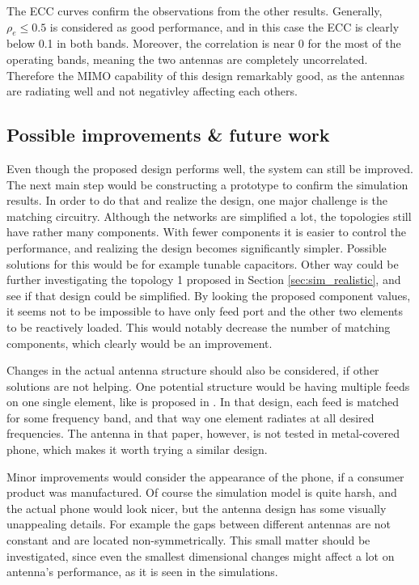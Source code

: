 The ECC curves confirm the observations from the other results. Generally, $\rho_e\leq0.5$ is considered as good performance, and in this case the ECC is clearly below 0.1 in both bands. Moreover, the correlation is near 0 for the most of the operating bands, meaning the two antennas are completely uncorrelated. Therefore the MIMO capability of this design remarkably good, as the antennas are radiating well and not negativley affecting each others.

\subsection{Possible improvements \& future work}
\label{sec:improvements}
Even though the proposed design performs well, the system can still be improved. The next main step would be constructing a prototype to confirm the simulation results. In order to do that and realize the design, one major challenge is the matching circuitry. Although the networks are simplified a lot, the topologies still have rather many components. With fewer components it is easier to control the performance, and realizing the design becomes significantly simpler. Possible solutions for this would be for example tunable capacitors. Other way could be further investigating the topology 1 proposed in Section \ref{sec:sim_realistic}, and see if that design could be simplified. By looking the proposed component values, it seems not to be impossible to have only feed port and the other two elements to be reactively loaded. This would notably decrease the number of matching components, which clearly would be an improvement.

Changes in the actual antenna structure should also be considered, if other solutions are not helping. One potential structure would be having multiple feeds on one single element, like is proposed in \cite{valkonen_multifeed}. In that design, each feed is matched for some frequency band, and that way one element radiates at all desired frequencies. The antenna in that paper, however, is not tested in metal-covered phone, which makes it worth trying a similar design.

Minor improvements would consider the appearance of the phone, if a consumer product was manufactured. Of course the simulation model is quite harsh, and the actual phone would look nicer, but the antenna design has some visually unappealing details. For example the gaps between different antennas are not constant and are located non-symmetrically. This small matter should be investigated, since even the smallest dimensional changes might affect a lot on antenna's performance, as it is seen in the simulations.

